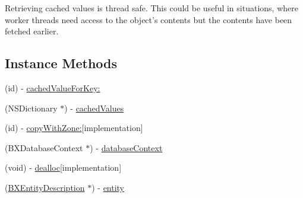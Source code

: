 Retrieving cached values is thread safe. This could be useful in situations, where worker threads need access to the object's contents but the contents have been fetched earlier. \subsection*{Instance Methods}
\begin{DoxyCompactItemize}
\item 
(id) -\/ \hyperlink{interface_b_x_database_object_aab8dce45cac76c0f46d101bd162d4045}{cached\+Value\+For\+Key\+:}
\item 
(N\+S\+Dictionary $\ast$) -\/ \hyperlink{interface_b_x_database_object_ae6f09f3e379fd669797d9d05330dcd97}{cached\+Values}
\item 
\hypertarget{interface_b_x_database_object_a2ef9884712a89c2e20c8a08cd46a3ec7}{}(id) -\/ \hyperlink{interface_b_x_database_object_a2ef9884712a89c2e20c8a08cd46a3ec7}{copy\+With\+Zone\+:}{\ttfamily  \mbox{[}implementation\mbox{]}}\label{interface_b_x_database_object_a2ef9884712a89c2e20c8a08cd46a3ec7}

\item 
(B\+X\+Database\+Context $\ast$) -\/ \hyperlink{interface_b_x_database_object_a5c59c1541c04976f7d427bedda08da2f}{database\+Context}
\item 
\hypertarget{interface_b_x_database_object_a071b3579cf57575dcf28b8ababcd962a}{}(void) -\/ \hyperlink{interface_b_x_database_object_a071b3579cf57575dcf28b8ababcd962a}{dealloc}{\ttfamily  \mbox{[}implementation\mbox{]}}\label{interface_b_x_database_object_a071b3579cf57575dcf28b8ababcd962a}

\item 
\hypertarget{interface_b_x_database_object_a670e2b54915aa6068d683da023fa184e}{}(\hyperlink{interface_b_x_entity_description}{B\+X\+Entity\+Description} $\ast$) -\/ \hyperlink{interface_b_x_database_object_a670e2b54915aa6068d683da023fa184e}{entity}\label{interface_b_x_database_object_a670e2b54915aa6068d683da023fa184e}


\end{DoxyCompactItemize}
